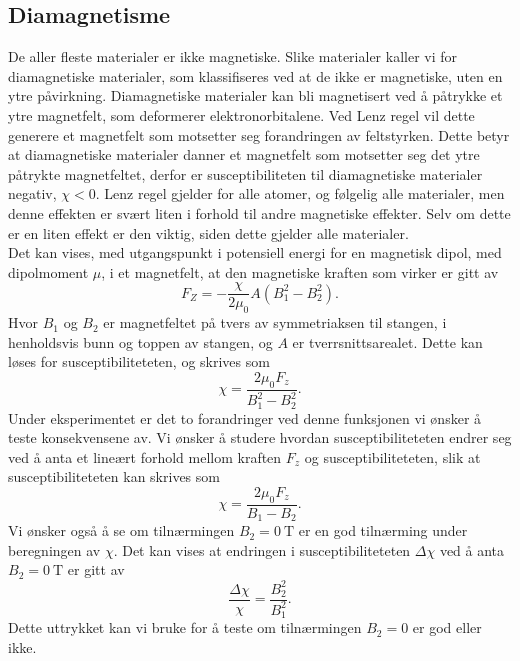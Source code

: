 \documentclass[%
 reprint,
 amsmath,amssymb,
 aps,
 norsk,
]{revtex4-1}
\begin{document}
\subsection{Diamagnetisme}
De aller fleste materialer er ikke magnetiske. Slike materialer kaller vi for diamagnetiske materialer, som klassifiseres ved at de ikke er magnetiske, uten en ytre påvirkning. Diamagnetiske materialer kan bli magnetisert ved å påtrykke et ytre magnetfelt, som deformerer elektronorbitalene. Ved Lenz regel vil dette generere et magnetfelt som motsetter seg forandringen av feltstyrken. Dette betyr at diamagnetiske materialer danner et magnetfelt som motsetter seg det ytre påtrykte magnetfeltet, derfor er susceptibiliteten til diamagnetiske materialer negativ, $\chi < 0$. Lenz regel gjelder for alle atomer, og følgelig alle materialer, men denne effekten er svært liten i forhold til andre magnetiske effekter. Selv om dette er en liten effekt er den viktig, siden dette gjelder alle materialer.\\Det kan vises, med utgangspunkt i potensiell energi for en magnetisk dipol, med dipolmoment $\mu$, i et magnetfelt, at den magnetiske kraften som virker er gitt av
\begin{equation}
  F_Z = -\frac{\chi}{2\mu_0}A\left(B_1^2 - B_2^2\right). \label{vismut}
\end{equation}
Hvor $B_1$ og $B_2$ er magnetfeltet på tvers av symmetriaksen til stangen, i henholdsvis bunn og toppen av stangen, og $A$ er tverrsnittsarealet. Dette kan løses for susceptibiliteteten, og skrives som
\begin{equation}
  \chi = \frac{2\mu_0F_z}{B_1^2 - B_2^2}.
\end{equation}
Under eksperimentet er det to forandringer ved denne funksjonen vi ønsker å teste konsekvensene av. Vi ønsker å studere hvordan susceptibiliteteten endrer seg ved å anta et lineært forhold mellom kraften $F_z$ og susceptibiliteteten, slik at susceptibiliteteten kan skrives som
\begin{equation}
  \chi = \frac{2\mu_0F_z}{B_1 - B_2}.\label{lin_chi}
\end{equation}
Vi ønsker også å se om tilnærmingen $B_2=\SI{0}{\tesla}$ er en god tilnærming under beregningen av $\chi$. Det kan vises at endringen i susceptibiliteteten $\Delta \chi$ ved å anta $B_2=\SI{0}{\tesla}$ er gitt av
\begin{equation}
  \frac{\Delta \chi}{\chi} = \frac{B_2^2}{B_1^2}. \label{test_chi}
\end{equation}
Dette uttrykket kan vi bruke for å teste om tilnærmingen $B_2=0$ er god eller ikke.
\end{document}
